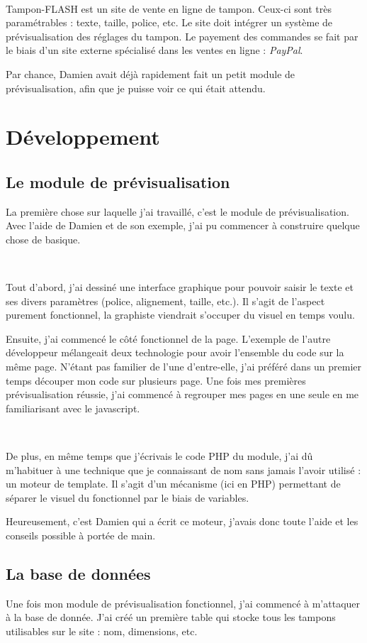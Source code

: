 ~

Tampon-FLASH est un site de vente en ligne de tampon. Ceux-ci sont très paramétrables : texte, taille, police, etc. Le site doit intégrer un système de prévisualisation des réglages du tampon. Le payement des commandes se fait par le biais d'un site externe spécialisé dans les ventes en ligne : \emph{PayPal}.

Par chance, Damien avait déjà rapidement fait un petit module de prévisualisation, afin que je puisse voir ce qui était attendu.

\section{Développement}
\subsection{Le module de prévisualisation}
La première chose sur laquelle j'ai travaillé, c'est le module de prévisualisation. Avec l'aide de Damien et de son exemple, j'ai pu commencer à construire quelque chose de basique.

~

Tout d'abord, j'ai \og dessiné \fg{} une interface graphique pour pouvoir saisir le texte et ses divers paramètres (police, alignement, taille, etc.). Il s'agit de l'aspect purement fonctionnel, la graphiste viendrait s'occuper du visuel en temps voulu.

Ensuite, j'ai commencé le côté fonctionnel de la page. L'exemple de l'autre développeur mélangeait deux technologie pour avoir l'ensemble du code sur la même page. N'étant pas familier de l'une d'entre-elle, j'ai préféré dans un premier temps découper mon code sur plusieurs page. Une fois mes premières prévisualisation réussie, j'ai commencé à regrouper mes pages en une seule en me familiarisant avec le javascript.

~

De plus, en même temps que j'écrivais le code PHP du module, j'ai dû m'habituer à une technique que je connaissant de nom sans jamais l'avoir utilisé : un moteur de template. Il s'agit d'un mécanisme (ici en PHP) permettant de séparer le visuel du fonctionnel par le biais de variables.

Heureusement, c'est Damien qui a écrit ce moteur, j'avais donc toute l'aide et les conseils possible à portée de main.

\subsection{La base de données}
Une fois mon module de prévisualisation fonctionnel, j'ai commencé à m'attaquer à la base de donnée. J'ai créé un première table qui stocke tous les tampons utilisables sur le site : nom, dimensions, etc.

